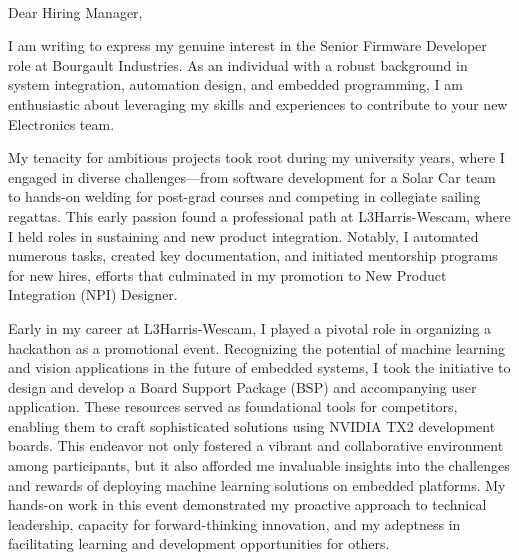 \documentclass[a4paper,ragged2e,withhyper]{altacv}
\begin{document}
\graphicspath{
    {emoticons/interests}
}

\DeclareRobustCommand{\addEmoticon}[1]{%
  \begingroup\normalfont
  \texttt{[image: \#1]}%
  \endgroup
}

\\
  \medskip


\begin{fullwidth}
\makecvheader


\noindent
Dear Hiring Manager,

\vspace{0.5cm}

\noindent
I am writing to express my genuine interest in the Senior Firmware Developer role at Bourgault Industries. As an individual with a robust background in system integration, automation design, and embedded programming, I am enthusiastic about leveraging my skills and experiences to contribute to your new Electronics team.

\vspace{0.5cm}

\noindent

My tenacity for ambitious projects took root during my university years, where I engaged in diverse challenges—from software development for a Solar Car team to hands-on welding for post-grad courses and competing in collegiate sailing regattas. This early passion found a professional path at L3Harris-Wescam, where I held roles in sustaining and new product integration. Notably, I automated numerous tasks, created key documentation, and initiated mentorship programs for new hires, efforts that culminated in my promotion to New Product Integration (NPI) Designer.

\vspace{0.5cm}

\noindent

Early in my career at L3Harris-Wescam, I played a pivotal role in organizing a hackathon as a promotional event. Recognizing the potential of machine learning and vision applications in the future of embedded systems, I took the initiative to design and develop a Board Support Package (BSP) and accompanying user application. These resources served as foundational tools for competitors, enabling them to craft sophisticated solutions using NVIDIA TX2 development boards. This endeavor not only fostered a vibrant and collaborative environment among participants, but it also afforded me invaluable insights into the challenges and rewards of deploying machine learning solutions on embedded platforms. My hands-on work in this event demonstrated my proactive approach to technical leadership, capacity for forward-thinking innovation, and my adeptness in facilitating learning and development opportunities for others.


\end{fullwidth}
\end{document}
